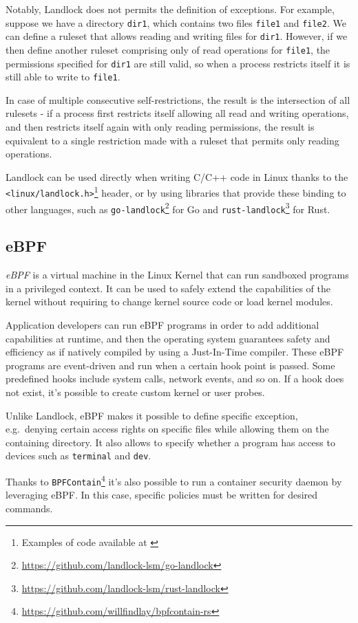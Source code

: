 Notably, Landlock does not permits the definition of exceptions.
For example, suppose we have a directory \texttt{dir1}, which contains two files
\texttt{file1} and \texttt{file2}. We can define a ruleset that allows
reading and writing files for \texttt{dir1}.
However, if we then define another ruleset comprising only of read operations
for \texttt{file1}, the permissions specified for \texttt{dir1} are still
valid, so when a process restricts itself it is still able to write to \texttt{file1}.

In case of multiple consecutive self-restrictions, the result is the intersection
of all rulesets - if a process first restricts itself allowing all read and writing operations,
and then restricts itself again with only reading permissions, the result is equivalent
to a single restriction made with a ruleset that permits only reading operations.

Landlock can be used directly when writing C/C++ code in Linux thanks to the
\texttt{<linux/landlock.h>}\footnote{Examples of code available at \cite{landlock-user-space}}
header, or by using libraries that provide these binding to other languages,
such as \texttt{go-landlock}\footnote{\url{https://github.com/landlock-lsm/go-landlock}}
for Go and \texttt{rust-landlock}\footnote{\url{https://github.com/landlock-lsm/rust-landlock}} for Rust.

\subsection{eBPF}
\textit{eBPF} \cite{ebpf} is a virtual machine in the Linux Kernel that can run sandboxed programs
in a privileged context. It can be used to safely extend the capabilities of the kernel
without requiring to change kernel source code or load kernel modules.

Application developers can run eBPF programs in order to add additional capabilities at runtime,
and then the operating system guarantees safety and efficiency as if natively compiled
by using a Just-In-Time compiler.
These eBPF programs are event-driven and run when a certain hook point is passed. Some
predefined hooks include system calls, network events, and so on. If a hook does not exist,
it's possible to create custom kernel or user probes.

Unlike Landlock, eBPF makes it possible to define specific exception, e.g.\ denying
certain access rights on specific files while allowing them on the containing directory.
It also allows to specify whether a program has access to devices such as \texttt{terminal}
and \texttt{dev}.

Thanks to \texttt{BPFContain}\footnote{\url{https://github.com/willfindlay/bpfcontain-rs}}
it's also possible to run a container security daemon by leveraging eBPF.  In this case,
specific policies must be written for desired commands.